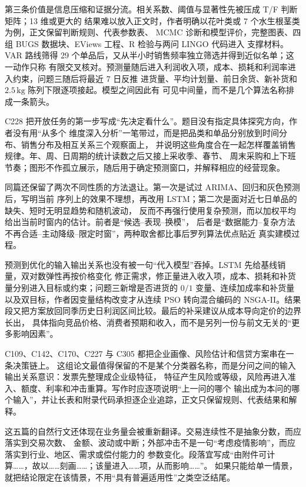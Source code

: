 第三条价值是信息压缩和证据分流。相关系数、阈值与显著性先被压成 T/F 判断矩阵；13 维或更大的
结果难以放入正文时，作者明确以花叶类或 7 个水生根茎类为例，正文保留判断规则、代表参数表、
MCMC 诊断和模型评价，完整图表、四组 BUGS 数据块、EViews 工程、R 检验与两问 LINGO 代码进入
支撑材料。VAR 路线筛得 29 个单品后，又从半小时销售频率独立筛选并得到近似名单；这一动作只称
有限交叉核对。预测量随后进入利润收入项，成本、损耗和利润率进入约束，问题三随后将最近 7 日反推
进货量、平均计划量、前日余货、新补货和 $2.5\,\mathrm{kg}$ 陈列下限逐项接起。模型之间因此有
可见中间量，而不是几个算法名称排成一条箭头。

C228 把开放任务的第一步写成“先决定看什么”。题目没有指定具体探究方向，作者没有用“从多个
维度深入分析”一笔带过，而是把品类和单品分别放到时间分布、销售分布及相互关系三个观察面上，
并说明这些角度合在一起怎样覆盖销售规律。年、周、日周期的统计读数之后又接上采收季、春节、
周末采购和上下班节奏；图形不作孤立展示，随后用于确定预测窗口，并解释相应的经营现象。

同篇还保留了两次不同性质的方法退让。第一次是试过 ARIMA、回归和灰色预测后，写明当前
序列上的效果不理想，再改用 LSTM；第二次是面对近七日单品的缺失、短时无明显趋势和随机波动，
反而不再强行使用复杂预测，而以加权平均给出当前时窗内的估计。前者是“候选--表现--换模”，
后者是“数据能力--复杂方法不再合适--主动降级--限定时窗”，两种取舍都比事后罗列算法优点贴近
真实建模过程。

预测到优化的输入输出关系也没有被一句“代入模型”吞掉。LSTM 先给基线销量，双对数弹性再按价格变化
修正需求，修正量进入收入项，成本、损耗和补货量分别进入目标或约束；问题三新增是否进货的
$0/1$ 变量、连续加成率和补货量以及双目标，作者因变量结构改变才从连续 PSO 转向混合编码的
NSGA-II。结果段又把方案放回同季历史日利润区间比较。最后的补采建议从成本导向定价的边界长出，
具体指向竞品价格、消费者预期和收入，而不是另列一份与前文无关的“更多影响因素”。

C109、C142、C170、C227 与 C305 都把企业画像、风险估计和信贷方案串在一条决策链上。
这组论文最值得保留的不是某个分类器名称，而是分问之间的输入输出关系意识：发票先整理成企业级特征，
特征产生风险或等级，风险再进入准入、额度、利率和冲击重算。写作时应逐项说明“上一问的哪个
输出成为本问的哪个输入”，并让长表和附录代码承担逐企业追踪，正文只保留规则、代表结果和解释。

这五篇的自然行文还体现在业务量会被重新翻译。交易连续性不是抽象分数，而应落实到交易次数、
金额、波动或中断；外部冲击不是一句“考虑疫情影响”，而应落实到行业、地区、需求或偿付能力的
参数变化。段落宜写成“由附件可计算……，故以……刻画……；该量进入……项，从而影响……”。
如果只能给单一情景，就把结论限定在该情景，不用“具有普遍适用性”之类空泛结尾。

